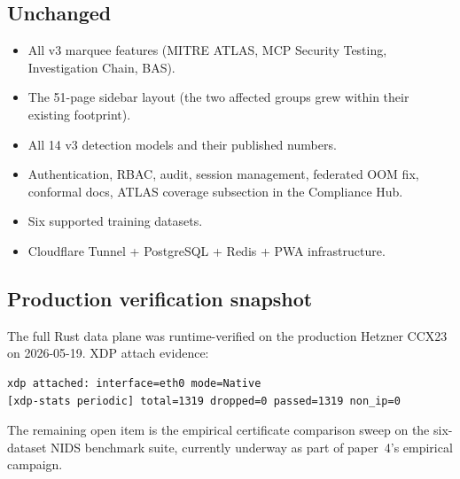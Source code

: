 \documentclass[11pt,a4paper]{article}
\begin{document}
\subsection*{Unchanged}
\begin{itemize}[nosep]
  \item All v3 marquee features (MITRE ATLAS, MCP Security
        Testing, Investigation Chain, BAS).
  \item The 51-page sidebar layout (the two affected groups grew
        within their existing footprint).
  \item All 14 v3 detection models and their published numbers.
  \item Authentication, RBAC, audit, session management, federated
        OOM fix, conformal docs, ATLAS coverage subsection in the
        Compliance Hub.
  \item Six supported training datasets.
  \item Cloudflare Tunnel + PostgreSQL + Redis + PWA infrastructure.
\end{itemize}

\subsection*{Production verification snapshot}

The full Rust data plane was runtime-verified on the production
Hetzner CCX23 on 2026-05-19.  XDP attach evidence:

\begin{lstlisting}
xdp attached: interface=eth0 mode=Native
[xdp-stats periodic] total=1319 dropped=0 passed=1319 non_ip=0
\end{lstlisting}

The remaining open item is the empirical certificate comparison
sweep on the six-dataset NIDS benchmark suite, currently underway as
part of paper~4's empirical campaign.
\end{document}
